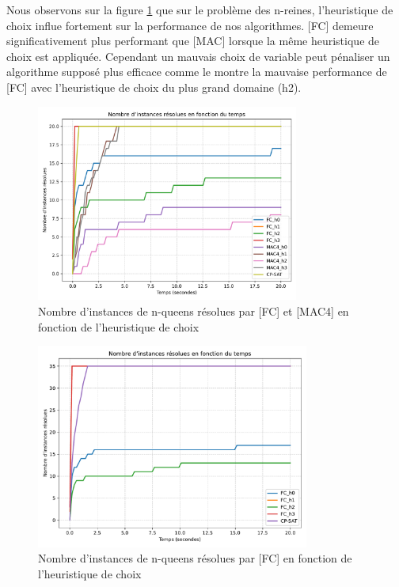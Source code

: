 \documentclass[14pt]{article}
\begin{document}
Nous observons sur la figure \ref{fig:n-queens-h1} que sur le problème des n-reines, l'heuristique de choix influe fortement sur la performance de nos algorithmes. [FC] demeure significativement plus performant que [MAC] lorsque la même heuristique de choix est appliquée. Cependant un mauvais choix de variable peut pénaliser un algorithme supposé plus efficace comme le montre la mauvaise performance de [FC] avec l'heuristique de choix du plus grand domaine (h2).

\begin{figure}[H]
	\centering
	\includegraphics[width=0.77\textwidth]{Images/n-queens-h-MAC-FC.png}
	\caption{Nombre d'instances de n-queens résolues par [FC] et [MAC4] en fonction de l'heuristique de choix}
	\label{fig:n-queens-h1}
\end{figure}

\begin{figure}[H]
	\centering
	\includegraphics[width=0.8\textwidth]{Images/n-queens-h-FC.pdf}
	\caption{Nombre d'instances de n-queens résolues par [FC] en fonction de l'heuristique de choix}
	\label{fig:n-queens-h2}
\end{figure}
\end{document}
